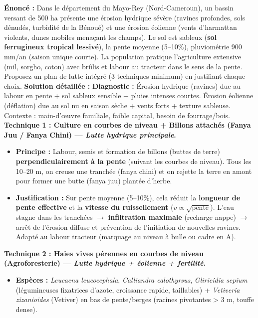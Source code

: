 \documentclass[11pt]{article}
\begin{document}
\begin{exoresolu}
    \textbf{Énoncé :} Dans le département du Mayo-Rey (Nord-Cameroun), un bassin versant de 500 ha présente une érosion hydrique sévère (ravines profondes, sols dénudés, turbidité de la Bénoué) et une érosion éolienne (vents d'harmattan violents, dunes mobiles menaçant les champs). Le sol est sableux (\textbf{sol ferrugineux tropical lessivé}), la pente moyenne (5–10\%), pluviométrie 900 mm/an (saison unique courte). La population pratique l'agriculture extensive (mil, sorgho, coton) avec brûlis et labour au tracteur dans le sens de la pente. Proposez un plan de lutte intégré (3 techniques minimum) en justifiant chaque choix.
    \tcblower
    \textbf{Solution détaillée :}
    \textbf{Diagnostic :} Érosion hydrique (ravines) due au labour en pente + sol sableux sensible + pluies intenses courtes. Érosion éolienne (déflation) due au sol nu en saison sèche + vents forts + texture sableuse. Contexte : main-d'œuvre familiale, faible capital, besoin de fourrage/bois.
    \vspace{0,2cm}
    \textbf{Technique 1 : Culture en courbes de niveau + Billons attachés (Fanya Juu / Fanya Chini) — \emph{Lutte hydrique principale}.}
    \begin{itemize}
        \item \textbf{Principe :} Labour, semis et formation de billons (buttes de terre) \textbf{perpendiculairement à la pente} (suivant les courbes de niveau). Tous les 10–20 m, on creuse une tranchée (fanya chini) et on rejette la terre en amont pour former une butte (fanya juu) plantée d'herbe.
        \item \textbf{Justification :} Sur pente moyenne (5–10\%), cela réduit la \textbf{longueur de pente effective} et la \textbf{vitesse du ruissellement} ($v \propto \sqrt{\text{pente}}$). L'eau stagne dans les tranchées $\rightarrow$ \textbf{infiltration maximale} (recharge nappe) $\rightarrow$ arrêt de l'érosion diffuse et prévention de l'initiation de nouvelles ravines. Adapté au labour tracteur (marquage au niveau à bulle ou cadre en A).
    \end{itemize}
    \textbf{Technique 2 : Haies vives pérennes en courbes de niveau (Agroforesterie) — \emph{Lutte hydrique + éolienne + fertilité}.}
    \begin{itemize}
        \item \textbf{Espèces :} \emph{Leucaena leucocephala}, \emph{Calliandra calothyrsus}, \emph{Gliricidia sepium} (légumineuses fixatrices d'azote, croissance rapide, taillables) + \emph{Vetiveria zizanioides} (Vetiver) en bas de pente/berges (racines pivotantes > 3 m, touffe dense).

\end{itemize}
\end{exoresolu}
\end{document}
